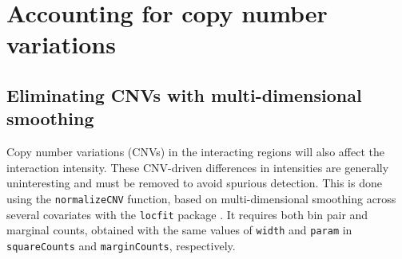 \documentclass[12pt]{report}
\newcommand{\code}[1]{{\small\texttt{#1}}}
\begin{document}
%



\section{Accounting for copy number variations}
\label{sec:copy}

\subsection{Eliminating CNVs with multi-dimensional smoothing}
Copy number variations (CNVs) in the interacting regions will also affect the interaction intensity. 
These CNV-driven differences in intensities are generally uninteresting and must be removed to avoid spurious detection.
This is done using the \code{normalizeCNV} function, based on multi-dimensional smoothing across several covariates with the \code{locfit} package \citep{loader1999local}.
It requires both bin pair and marginal counts, obtained with the same values of \code{width} and \code{param} in \code{squareCounts} and \code{marginCounts}, respectively.
\end{document}
